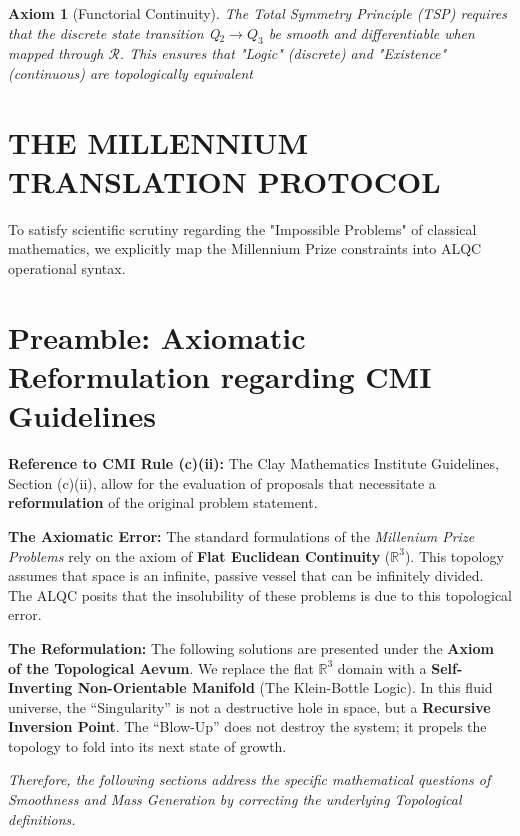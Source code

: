 \documentclass[11pt, letterpaper]{article}
\newtheorem{axiom}[theorem]{Axiom}
\begin{document}
\begin{axiom}[Functorial Continuity]
The Total Symmetry Principle (TSP) requires that the discrete state transition Q$_2 \to Q_3$ be smooth and differentiable when mapped through $\mathcal{R}$. This ensures that "Logic" (discrete) and "Existence" (continuous) are topologically equivalent
\end{axiom}

\newpage
\section{THE MILLENNIUM TRANSLATION PROTOCOL}\label{sec:partVII}

To satisfy scientific scrutiny regarding the "Impossible Problems" of classical mathematics, we explicitly map the Millennium Prize constraints into ALQC operational syntax.

\section*{Preamble: Axiomatic Reformulation regarding CMI Guidelines}\label{sec:1}

\noindent \textbf{Reference to CMI Rule (c)(ii):}
The Clay Mathematics Institute Guidelines, Section (c)(ii), allow for the evaluation of proposals that necessitate a \textbf{reformulation} of the original problem statement.

\noindent \textbf{The Axiomatic Error:}
The standard formulations of the \textit{Millenium Prize Problems} rely on the axiom of \textbf{Flat Euclidean Continuity} ($\mathbb{R}^3$). This topology assumes that space is an infinite, passive vessel that can be infinitely divided. The ALQC posits that the insolubility of these problems is due to this topological error.

\noindent \textbf{The Reformulation:}
The following solutions are presented under the \textbf{Axiom of the Topological Aevum}. We replace the flat $\mathbb{R}^3$ domain with a \textbf{Self-Inverting Non-Orientable Manifold} (The Klein-Bottle Logic). In this fluid universe, the ``Singularity'' is not a destructive hole in space, but a \textbf{Recursive Inversion Point}. The ``Blow-Up'' does not destroy the system; it propels the topology to fold into its next state of growth.

\noindent \textit{Therefore, the following sections address the specific mathematical questions of Smoothness and Mass Generation by correcting the underlying Topological definitions.}
\end{document}
